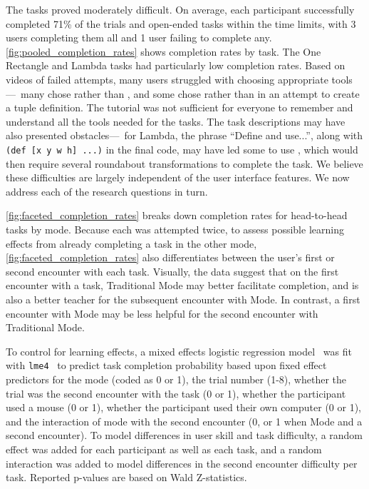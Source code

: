 The tasks proved moderately difficult. On average, each participant successfully completed 71\%
of the trials and open-ended tasks within the time limits, with 3 users
completing them all and 1 user failing to complete any.
\autoref{fig:pooled_completion_rates} shows completion rates by task.
%
The One Rectangle and Lambda tasks had particularly low completion rates. Based on
videos of failed attempts, many users struggled with choosing appropriate
tools---\eg{}~many chose  rather than
, and some chose  rather than
 in an attempt to create a tuple definition.
%
The tutorial was not sufficient for everyone to remember and understand all the
tools needed for the tasks.
%
The task descriptions may have also presented obstacles---\eg{}~for Lambda,
the phrase ``Define and use...'', along with \verb+(def [x y w h] ...)+ in the final
code, may have led some to use , which would then
require several roundabout transformations to complete the task.
%
We believe these difficulties
are largely independent of the user interface features.
%
We now address each of the research questions in turn.



\autoref{fig:faceted_completion_rates} breaks down
completion rates for head-to-head tasks by mode. Because each was attempted
twice,
to assess possible learning effects from already completing a task in the other mode,
\autoref{fig:faceted_completion_rates} also differentiates
between the user's first or second encounter with each task.
%
Visually, the data suggest that on the first encounter with a task, Traditional Mode may
better facilitate completion, and is also a better teacher for the
subsequent encounter with
\deuce{} Mode. In contrast, a first encounter with \deuce{} Mode may be less helpful for the second
encounter
with Traditional Mode.

To control for learning effects, a mixed effects logistic
regression model~\cite{GelmanHill} was fit with \texttt{lme4}~\cite{lme4} to predict task completion probability based upon fixed effect
predictors for the mode (coded as 0 or 1), the trial number (1-8), whether the trial was the second
encounter with the task (0 or 1), whether the participant used a mouse (0 or 1), whether the
participant used their own computer (0 or 1), and the interaction of mode with the second
encounter (0, or 1 when \deuce{} Mode and a second encounter). To model
differences in user skill and task difficulty, a random effect was added for each participant as well as
each task, and a random interaction was added to model
differences in the second encounter difficulty per task. Reported p-values are based on Wald Z-statistics.

